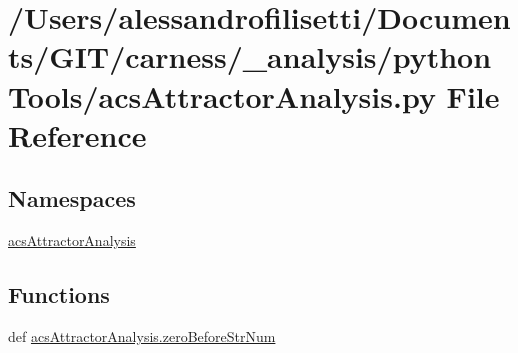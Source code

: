 \hypertarget{a00039}{\section{/\-Users/alessandrofilisetti/\-Documents/\-G\-I\-T/carness/\-\_\-analysis/python\-Tools/acs\-Attractor\-Analysis.py File Reference}
\label{a00039}
}
\subsection*{Namespaces}
\begin{DoxyCompactItemize}
\item 
\hyperlink{a00122}{acs\-Attractor\-Analysis}
\end{DoxyCompactItemize}
\subsection*{Functions}
\begin{DoxyCompactItemize}
\item 
def \hyperlink{a00122_a97aba03091fd66dde4375e3dbffdbede}{acs\-Attractor\-Analysis.\-zero\-Before\-Str\-Num}
\end{DoxyCompactItemize}
